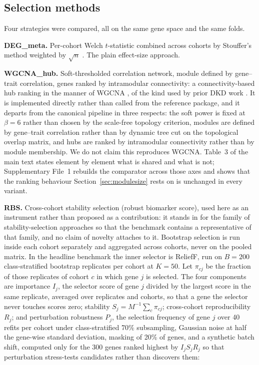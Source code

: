 \documentclass[11pt]{article}
\begin{document}
\subsection{Selection methods}\label{sec:selectors}

Four strategies were compared, all on the same gene space and the same folds.

\textbf{DEG\_meta.} Per-cohort Welch $t$-statistic combined across cohorts by Stouffer's method
weighted by $\sqrt{n}$ \cite{whitlock2005}. The plain effect-size approach.

\textbf{WGCNA\_hub.} Soft-thresholded correlation network, module defined by gene--trait
correlation, genes ranked by intramodular connectivity: a connectivity-based hub ranking in the
manner of WGCNA \cite{langfelder2008}, of the kind used by prior DKD work \cite{feng2021}. It is
implemented directly rather than called from the reference package, and it departs from the
canonical pipeline in three respects: the soft power is fixed at $\beta = 6$ rather than chosen
by the scale-free topology criterion, modules are defined by gene--trait correlation rather than
by dynamic tree cut on the topological overlap matrix, and hubs are ranked by intramodular
connectivity rather than by module membership. We do not claim this reproduces WGCNA. Table~3 of the main text states element by element what is shared and what is not; Supplementary File~1 rebuilds the comparator across those axes and shows that the ranking behaviour Section~\ref{sec:modulesize} rests on is unchanged in every variant.



\textbf{RBS.} Cross-cohort stability selection (robust biomarker score), used here as an instrument rather than
proposed as a contribution: it stands in for the family of stability-selection approaches
\cite{meinshausen2010} so that the benchmark contains a representative of that family, and no
claim of novelty attaches to it. Bootstrap selection is run inside each cohort separately and
aggregated across cohorts, never on the pooled matrix. In the headline benchmark the inner selector is ReliefF, run on $B = 200$ class-stratified bootstrap replicates per cohort at $K = 50$. Let $\pi_{cj}$ be the fraction of those replicates of cohort $c$ in which gene $j$ is selected. The four components are importance $I_j$, the selector score of gene $j$ divided by the largest score in the same replicate, averaged over replicates and cohorts, so that a gene the selector never touches scores zero; stability $S_j = M^{-1} \sum_c \pi_{cj}$; cross-cohort reproducibility $R_j$; and perturbation robustness $P_j$, the selection frequency of gene $j$ over 40 refits per cohort under class-stratified 70\% subsampling, Gaussian noise at half the gene-wise standard deviation, masking of 20\% of genes, and a synthetic batch shift, computed only for the 300 genes ranked highest by $I_j S_j R_j$ so that perturbation stress-tests candidates rather than discovers them:
\end{document}

